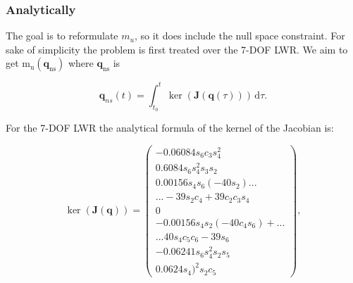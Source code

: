 \subsubsection{Analytically}
\label{sec:global_analytical}



\label{subsec:imposing_ns_constraint}


The goal is to reformulate $m_u$, so it does include the null space constraint. 
For sake of simplicity the problem is first treated over the 7-DOF LWR.  We aim to get $\mathrm{m_u(\mathbf{q}_{ns})}$ where $\mathrm{\mathbf{q}_{ns}}$ is


\begin{equation}
\mathbf{q}_{ns}(t) = \int_{t_0}^t \! \ker(\mathbf{J}(\mathbf{q}(\tau))) \, \mathrm{d}\tau. 
\label{eq:integral_kernel}
\end{equation}

For the 7-DOF LWR the analytical formula of the kernel of the Jacobian is:

\begin{equation}
\ker(\mathbf{J}(\mathbf{q}))  =\begin{pmatrix} -0.06084s_6 c_3 s_4^2\\
0. 6084s_6 s_4^2 s_3 s_2\\
0.00156s_4 s_6 (-40s_2)...\\
...-39s_2 c_4 +39c_2 c_3 s_4\\
0\\
-0.00156s_4 s_2 (-40c_4 s_6)+...\\
...40s_4 c_5 c_6 -39s_6\\
-0.06241s_6 s_4^2 s_2 s_5\\
0.0624s_4)^2 s_2 c_5	
\end{pmatrix}	,
\label{eq:dq_ns}
\end{equation}


